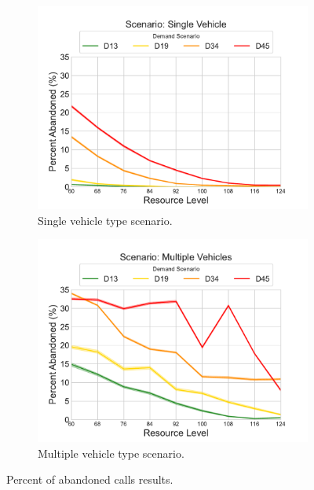 \documentclass[preprint,12pt]{elsarticle}
\begin{document}
\begin{figure}
\begin{center}
\begin{subfigure}{0.43\textwidth}
\includegraphics[width=\textwidth]{img/results/single_PercentAbandoned}
\caption{Single vehicle type scenario.}
\label{fig:results_abandoned_single}
\end{subfigure}
\begin{subfigure}{0.43\textwidth}
\includegraphics[width=\textwidth]{img/results/multiple_PercentAbandoned}
\caption{Multiple vehicle type scenario.}
\label{fig:results_abandoned_multiple}
\end{subfigure} 
\end{center}
\caption{Percent of abandoned calls results.}
\end{figure}
\end{document}
